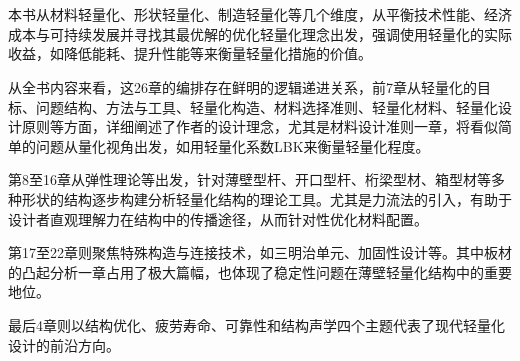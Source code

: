 \documentclass[12pt, oneside, a4paper]{ctexart}
\begin{document}
\section{}
\par{}
本书从材料轻量化、形状轻量化、制造轻量化等几个维度，从平衡技术性能、经济成本与可持续发展并寻找其最优解的优化轻量化理念出发，强调使用轻量化的实际收益，如降低能耗、提升性能等来衡量轻量化措施的价值。
\par{}
从全书内容来看，这26章的编排存在鲜明的逻辑递进关系，前7章从轻量化的目标、问题结构、方法与工具、轻量化构造、材料选择准则、轻量化材料、轻量化设计原则等方面，详细阐述了作者的设计理念，尤其是材料设计准则一章，将看似简单的问题从量化视角出发，如用轻量化系数LBK来衡量轻量化程度。
\par{}
第8至16章从弹性理论等出发，针对薄壁型杆、开口型杆、桁梁型材、箱型材等多种形状的结构逐步构建分析轻量化结构的理论工具。尤其是力流法的引入，有助于设计者直观理解力在结构中的传播途径，从而针对性优化材料配置。
\par{}
第17至22章则聚焦特殊构造与连接技术，如三明治单元、加固性设计等。其中板材的凸起分析一章占用了极大篇幅，也体现了稳定性问题在薄壁轻量化结构中的重要地位。
\par{}
最后4章则以结构优化、疲劳寿命、可靠性和结构声学四个主题代表了现代轻量化设计的前沿方向。
\par{}
\quad{}
\par{}
\end{document}
